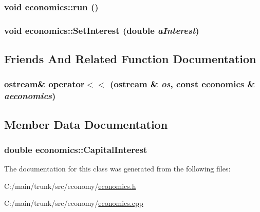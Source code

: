 \hypertarget{classeconomics_a42c3852359d9f458dba908754c1a8006}{
\subsubsection[{run}]{\setlength{\rightskip}{0pt plus 5cm}void economics::run ()}}
\label{classeconomics_a42c3852359d9f458dba908754c1a8006}
\hypertarget{classeconomics_a0b6096acb9522f4bcf155c15132ea0e5}{
\subsubsection[{SetInterest}]{\setlength{\rightskip}{0pt plus 5cm}void economics::SetInterest (double {\em aInterest})}}
\label{classeconomics_a0b6096acb9522f4bcf155c15132ea0e5}


\subsection{Friends And Related Function Documentation}
\hypertarget{classeconomics_ac7fa5eba4fc9ff13bcf5d57d9c1183a2}{
\subsubsection[{operator$<$$<$}]{\setlength{\rightskip}{0pt plus 5cm}ostream\& operator$<$$<$ (ostream \& {\em os}, \/  const {\bf economics} \& {\em aeconomics})}}
\label{classeconomics_ac7fa5eba4fc9ff13bcf5d57d9c1183a2}


\subsection{Member Data Documentation}
\hypertarget{classeconomics_a98c8e8e0f654dbaa12660a2725e81e51}{
\subsubsection[{CapitalInterest}]{\setlength{\rightskip}{0pt plus 5cm}double {\bf economics::CapitalInterest}}}
\label{classeconomics_a98c8e8e0f654dbaa12660a2725e81e51}


The documentation for this class was generated from the following files:\begin{DoxyCompactItemize}
\item 
C:/main/trunk/src/economy/\hyperlink{economics_8h}{economics.h}\item 
C:/main/trunk/src/economy/\hyperlink{economics_8cpp}{economics.cpp}\end{DoxyCompactItemize}
